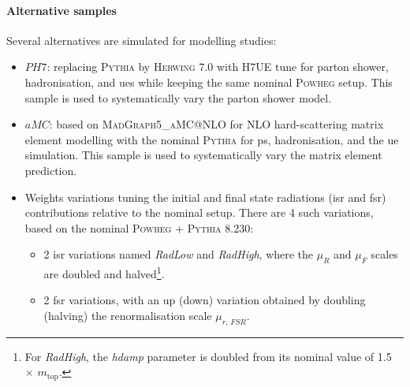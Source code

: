 \paragraph{Alternative samples} Several alternatives are simulated for modelling studies:
\begin{itemize}
  \item $PH7$: replacing \textsc{Pythia} by \textsc{Herwing} 7.0 with H7UE tune \cite{herwig7R} for parton shower, hadronisation, and \gls{ue}s while keeping the same nominal \textsc{Powheg} setup. This sample is used to systematically vary the parton shower model.
  \item $aMC$: based on \textsc{MadGraph5\_aMC@NLO} \cite{madgraph} for NLO hard-scattering matrix element modelling with the nominal \textsc{Pythia} for \gls{ps}, hadronisation, and the \gls{ue} simulation. This sample is used to systematically vary the matrix element prediction.
  \item Weights variations tuning the initial and final state radiations (\gls{isr} and \gls{fsr}) contributions relative to the nominal setup. There are 4 such variations, based on the nominal \textsc{Powheg} + \textsc{Pythia} 8.230:
  \begin{itemize}
    \item 2 \gls{isr} variations named \textit{RadLow} and \textit{RadHigh}, where the $\mu_R$ and $\mu_F$ scales are doubled and halved\footnote{For \textit{RadHigh}, the \textit{hdamp} parameter is doubled from its nominal value of 1.5 $\times$ $m_{\text{top}}$.}.
    \item 2 \gls{fsr} variations, with an up (down) variation obtained by doubling (halving) the renormalisation scale $\mu_{r,\, FSR}$. %
  \end{itemize}
\end{itemize} 

